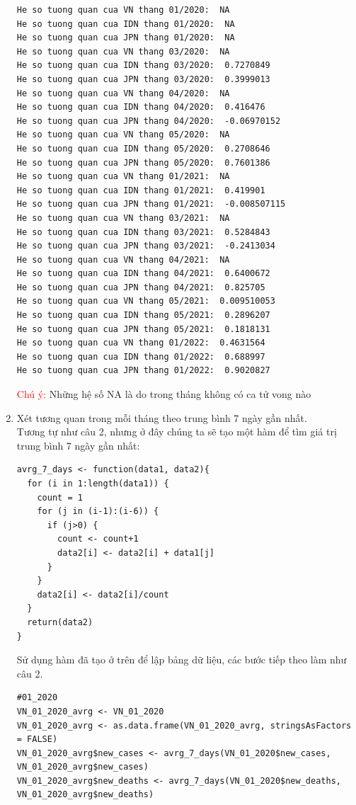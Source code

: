 \documentclass[a4paper]{article}
\theoremstyle{definition}
\begin{document}
\begin{enumerate}[1)]
\begin{lstlisting}
He so tuong quan cua VN thang 01/2020:  NA 
He so tuong quan cua IDN thang 01/2020:  NA 
He so tuong quan cua JPN thang 01/2020:  NA 
He so tuong quan cua VN thang 03/2020:  NA 
He so tuong quan cua IDN thang 03/2020:  0.7270849 
He so tuong quan cua JPN thang 03/2020:  0.3999013 
He so tuong quan cua VN thang 04/2020:  NA 
He so tuong quan cua IDN thang 04/2020:  0.416476 
He so tuong quan cua JPN thang 04/2020:  -0.06970152 
He so tuong quan cua VN thang 05/2020:  NA 
He so tuong quan cua IDN thang 05/2020:  0.2708646 
He so tuong quan cua JPN thang 05/2020:  0.7601386 
He so tuong quan cua VN thang 01/2021:  NA 
He so tuong quan cua IDN thang 01/2021:  0.419901 
He so tuong quan cua JPN thang 01/2021:  -0.008507115 
He so tuong quan cua VN thang 03/2021:  NA 
He so tuong quan cua IDN thang 03/2021:  0.5284843 
He so tuong quan cua JPN thang 03/2021:  -0.2413034 
He so tuong quan cua VN thang 04/2021:  NA 
He so tuong quan cua IDN thang 04/2021:  0.6400672 
He so tuong quan cua JPN thang 04/2021:  0.825705 
He so tuong quan cua VN thang 05/2021:  0.009510053 
He so tuong quan cua IDN thang 05/2021:  0.2896207 
He so tuong quan cua JPN thang 05/2021:  0.1818131 
He so tuong quan cua VN thang 01/2022:  0.4631564 
He so tuong quan cua IDN thang 01/2022:  0.688997 
He so tuong quan cua JPN thang 01/2022:  0.9020827 
\end{lstlisting}

\textcolor{red}{Chú ý:} Những hệ số NA là do trong tháng không có ca tử vong nào 

\item Xét tương quan trong mỗi tháng theo trung bình 7 ngày gần nhất. \\
Tương tự như câu 2, nhưng ở đây chúng ta sẽ tạo một hàm để tìm giá trị trung bình 7 ngày gần nhất:
\begin{lstlisting}
avrg_7_days <- function(data1, data2){
  for (i in 1:length(data1)) {
    count = 1
    for (j in (i-1):(i-6)) {
      if (j>0) {
        count <- count+1
        data2[i] <- data2[i] + data1[j]
      }
    }
    data2[i] <- data2[i]/count
  }
  return(data2)
}
\end{lstlisting}
Sử dụng hàm đã tạo ở trên để lập bảng dữ liệu, các bước tiếp theo làm như câu 2. 
\begin{lstlisting}
#01_2020
VN_01_2020_avrg <- VN_01_2020
VN_01_2020_avrg <- as.data.frame(VN_01_2020_avrg, stringsAsFactors = FALSE)
VN_01_2020_avrg$new_cases <- avrg_7_days(VN_01_2020$new_cases, VN_01_2020_avrg$new_cases)
VN_01_2020_avrg$new_deaths <- avrg_7_days(VN_01_2020$new_deaths, VN_01_2020_avrg$new_deaths) 
\end{lstlisting}


\end{enumerate}
\end{document}
